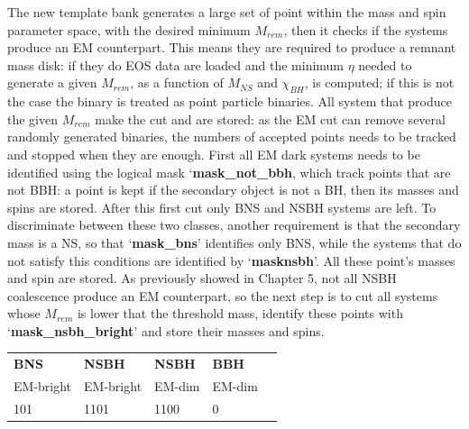 \documentclass[binding=0.6cm, LaM]{sapthesis}
\begin{document}
	The new template bank generates a large set of point within the mass and spin parameter space,
	with the desired minimum $M_{rem}$, then it checks if the systems produce an EM counterpart.
	This means they are required to produce a remnant mass disk: 
	if they do EOS data are loaded and the minimum $\eta$ needed to generate a given $M_{rem}$,
	as a function of $M_{NS}$ and $\chi_{BH}$,  is computed;
	if this is not the case the binary is treated as point particle binaries.
	All system that produce the given $M_{rem}$ make the cut and are stored: 
	as the EM cut can remove several randomly generated binaries, 
	the numbers of accepted points needs to be tracked and stopped when they are enough.
	First all EM dark systems needs to be identified using the logical mask ‘\textbf{{\color{red}mask\_not\_bbh}}, 
	which track points that are not BBH: a point is kept if the secondary object is not a BH, 
	then its masses and spins are stored.
	After this first cut only BNS and NSBH systems are left. 
	To discriminate between these two classes, another requirement is that the secondary mass is a NS, 
	so that ‘\textbf{{\color{green}mask\_bns}}’ identifies only BNS, while the systems that do not satisfy this conditions 
	are identified by ‘\textbf{{\color{black}masknsbh}}’.	
	All these point’s masses and spin are stored.
	As previously showed in Chapter 5, not all NSBH coalescence produce an EM counterpart, 
	so the next step is to cut all systems whose $M_{rem}$ is lower that the threshold mass, 
	identify these points with ‘\textbf{{\color{blue}mask\_nsbh\_bright}}’ and store their masses and spins. 

\begin{table}[]
\begin{tabular}{|l|l|l|l|l|} \hline
\textbf{BNS}  & \textbf{NSBH}       & \textbf{NSBH}    & \textbf{BBH}     \\
EM-bright     & EM-bright  & EM-dim  & EM-dim  \\\hline
{\color{red}1}0{\color{green}1}  & {\color{red}1}1{\color{green}0}{\color{blue}1}  & {\color{red}1}1{\color{green}0}{\color{blue}0}  & {\color{red}0}  \\ \hline
\end{tabular}
\end{table}
\end{document}

